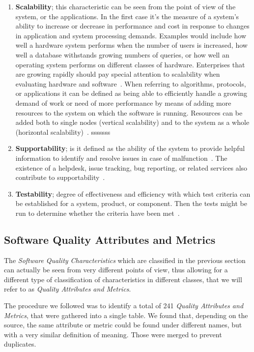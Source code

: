 \begin{enumerate}
    \item \textbf{Scalability}; this characteristic can be seen from the point of view of the system, or the applications. In the first case
    it's the measure of a system's ability to increase or decrease in performance and cost in response to changes in application and system processing demands. Examples would include how well a hardware system performs when the number of users is increased, how well a database withstands growing numbers of queries, or how well an operating system performs on different classes of hardware. Enterprises that are growing rapidly should pay special attention to scalability when evaluating hardware and software~\cite{gartner_2021}. When referring to algorithms, protocols, or applications it can be defined as being able to efficiently handle a growing demand of work or need of more performance by means of adding more resources to the system on which the software is running. Resources can be added both to single nodes (vertical scalability) and to the system as a whole (horizontal scalability)~\cite{bondi_2000}.
sssssss
    \item \textbf{Supportability}; is it defined as the ability of the system to provide helpful information  to identify and resolve issues in case of malfunction~\cite{microsoft_2010}. The existence of a helpdesk,  issue tracking, bug reporting, or related services also contribute to supportability~\cite{orviz_fernandez_eosc-synergy_2020}.

    \item \textbf{Testability}; degree of effectiveness and efficiency with which test criteria can be established for a system, product, or component. Then the tests might be run to determine whether the criteria have been met~\cite{iso_25010_2011_2017}.
\end{enumerate}

\subsection{Software Quality Attributes and Metrics}
\label{subsec:SW_quality_attributes}

The \textit{Software Quality Characteristics} which are classified in the previous section can actually be seen from very different points of view, thus allowing for a different type of classification of characteristics in different classes, that we will refer to as \textit{Quality Attributes and Metrics}.

The procedure we followed was to identify a total of 241 \textit{Quality Attributes and Metrics}, that were gathered into a single table. We found that, depending on the source, the same attribute or metric could be found under different names, but with a very similar definition of meaning. Those were merged to prevent duplicates.

